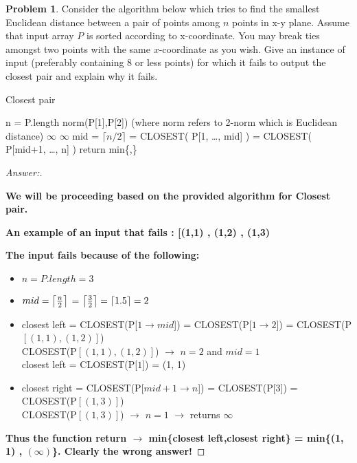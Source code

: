 \documentclass[11pt]{article}
\theoremstyle{definition}
\theoremstyle{definition}
\newtheorem{required}{Problem}
\theoremstyle{definition}
\begin{document}
\begin{required} \label{DCcounter}
Consider the algorithm below which tries to find the  smallest Euclidean distance between a pair of points among $n$ points in x-y plane. Assume that input array $P$ is sorted according to x-coordinate. You may break ties amongst two points with the same $x$-coordinate as you wish. Give an instance of input (preferably containing 8 or less points) for which it fails to output the closest pair and explain why it fails. 
\begin{algorithm}
\caption{Closest pair}\label{alg:closestpair}
\begin{algorithmic}[1]
\State n = P.length
\Return norm(P[1],P[2])  (where norm refers to 2-norm which is Euclidean distance)
\EndIf
{}
\Return $\infty$
\EndIf
{}
\Return $\infty$
\EndIf
\State mid = $\lceil n/2 \rceil$
\State {} = CLOSEST( P[1, \ldots, mid] )
\State {} = CLOSEST( P[mid+1, \ldots, n] )
\State return min\{,\}

\EndProcedure
\end{algorithmic}
\end{algorithm}



\begin{proof}[Answer:] \
\item \textbf{We will be proceeding based on the provided algorithm for Closest pair.} \\
\item \textbf{An example of an input that fails : [(1,1) , (1,2) , (1,3)} \\
\item \textbf{The input fails because of the following:}
\DeclarePairedDelimiter{\ceil}{\lceil}{\rceil}
\begin{itemize}
\item $n = P.length = 3$ \\
\item $mid = \ceil*{\frac{n}{2}}$ = $\ceil*{\frac{3}{2}} = \ceil*{1.5} = 2$ \\
\item closest left = CLOSEST(P[$1 \to mid$]) = CLOSEST(P[$1 \to 2$]) = CLOSEST(P$[(1,1) , (1,2)]$) \\
\hspace*{10mm} CLOSEST(P$[(1,1) , (1,2)]$) $\to$ $n = 2$ and $mid = 1$ \\
\hspace*{20mm} closest left = CLOSEST(P[$1$]) = (1, 1) \\
\item closest right = CLOSEST(P[$mid + 1 \to n$]) = CLOSEST(P[$3$]) = CLOSEST(P$[(1,3)]$) \\
\hspace*{10mm} CLOSEST(P$[(1, 3)]$) $\to$ $n = 1$ $\to$ returns $\infty$ \\
\end{itemize}
\item \textbf{Thus the function return $\to$ min\{closest left,closest right\} = min\{(1, 1) , $(\infty)$\}. Clearly the wrong answer!}
\end{proof}

\end{required}
\end{document}

